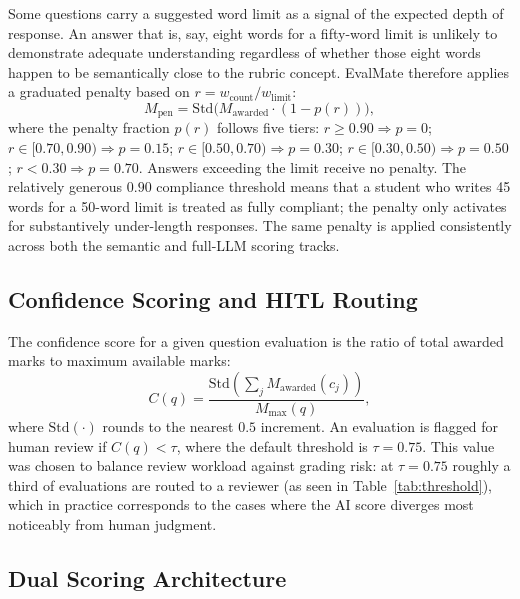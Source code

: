 \documentclass[conference]{IEEEtran}
\begin{document}
Some questions carry a suggested word limit as a signal of the
expected depth of response. An answer that is, say, eight words
for a fifty-word limit is unlikely to demonstrate adequate
understanding regardless of whether those eight words happen to
be semantically close to the rubric concept. EvalMate therefore
applies a graduated penalty based on $r = w_{\mathrm{count}}
/ w_{\mathrm{limit}}$:
\begin{equation}
  M_{\mathrm{pen}} = \mathrm{Std}\!\bigl(
    M_{\mathrm{awarded}} \cdot (1 - p(r))
  \bigr),
\end{equation}
where the penalty fraction $p(r)$ follows five tiers: $r \geq 0.90
\Rightarrow p=0$; $r \in [0.70, 0.90) \Rightarrow p=0.15$; $r \in
[0.50, 0.70) \Rightarrow p=0.30$; $r \in [0.30, 0.50) \Rightarrow
p=0.50$; $r < 0.30 \Rightarrow p=0.70$. Answers exceeding the limit
receive no penalty. The relatively generous $0.90$ compliance
threshold means that a student who writes 45 words for a 50-word
limit is treated as fully compliant; the penalty only activates
for substantively under-length responses. The same penalty is
applied consistently across both the semantic and full-LLM scoring
tracks.

\subsection{Confidence Scoring and HITL Routing}

The confidence score for a given question evaluation is the
ratio of total awarded marks to maximum available marks:
\begin{equation}
  C(q) = \frac{
    \mathrm{Std}\!\left(\textstyle\sum_j M_{\mathrm{awarded}}(c_j)\right)
  }{M_{\max}(q)},
  \label{eq:confidence}
\end{equation}
where $\mathrm{Std}(\cdot)$ rounds to the nearest $0.5$ increment.
An evaluation is flagged for human review if $C(q) < \tau$, where
the default threshold is $\tau = 0.75$. This value was chosen to
balance review workload against grading risk: at $\tau=0.75$
roughly a third of evaluations are routed to a reviewer (as seen
in Table~\ref{tab:threshold}), which in practice corresponds to the
cases where the AI score diverges most noticeably from human
judgment.

\subsection{Dual Scoring Architecture}
\end{document}
